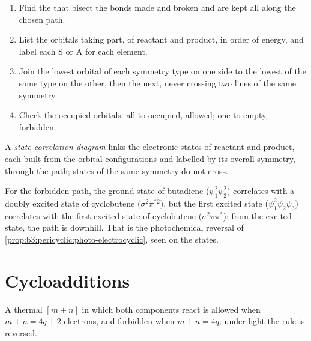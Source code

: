 \begin{method}\label{met:b3:pericyclic:correlation-diagram}
\begin{enumerate}
  \item Find the  that bisect the bonds made and broken and are
        kept all along the chosen path.
  \item List the orbitals taking part, of reactant and product, in order of
        energy, and label each S or A for each element.
  \item Join the lowest orbital of each symmetry type on one side to the lowest of
        the same type on the other, then the next, never crossing two lines of the
        same symmetry.
  \item Check the occupied orbitals: all to occupied, allowed; one to empty,
        forbidden.
\end{enumerate}
\end{method}

\begin{definition}\label{def:b3:pericyclic:state-correlation}
A \emph{state correlation diagram} links the
electronic states of reactant and product, each built from the orbital
configurations and labelled by its overall symmetry, through the path; states of
the same symmetry do not cross.
\end{definition}

For the forbidden  path, the ground state of butadiene ($\psi_1^2\psi_2^2$)
correlates with a doubly excited state of cyclobutene ($\sigma^2\pi^{*2}$), but the first excited
state ($\psi_1^2\psi_2\psi_3$) correlates with the first excited state of cyclobutene ($\sigma^2\pi\pi^*$): from the
excited state, the  path is downhill. That is the photochemical
reversal of \cref{prop:b3:pericyclic:photo-electrocyclic}, seen on the states.

\section{Cycloadditions}

\begin{theorem}[Cycloadditions]\label{thm:b3:pericyclic:cycloaddition}
A thermal $[m + n]$  in which both components react  is
allowed when $m + n = 4q + 2$ electrons, and forbidden when $m + n = 4q$; under light the
rule is reversed.
\end{theorem}

